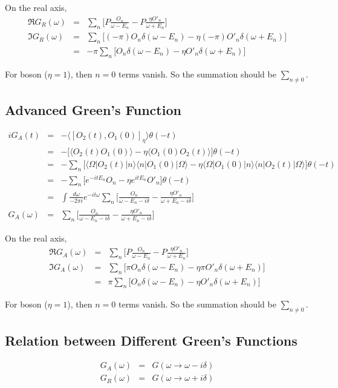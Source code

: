 \documentclass[12pt]{book}
\begin{document}
	On the real axis,
	\begin{eqnarray}
		\Re G_R(\omega)&=&\sum_n\Big[P\frac{O_n}{\omega-E_n}-P\frac{\eta O'_n}{\omega+E_n}\Big]\\
		\Im G_R(\omega)&=&\sum_{n}\big[(-\pi)O_n\delta(\omega-E_n)-\eta(-\pi)O'_n\delta(\omega+E_n)\big]\\
		&=&-\pi\sum_{n}\big[O_n\delta(\omega-E_n)-\eta O'_n\delta(\omega+E_n)\big]
	\end{eqnarray}
	
	For boson ($\eta=1$), then $n=0$ terms vanish. So the summation should be $\sum_{n\neq 0}$.
	\subsection{Advanced Green's Function}
	\begin{eqnarray}
		iG_A(t)&=&-\langle [O_2(t),O_1(0)]_\eta\rangle\theta(-t)\\
		&=&-\big[\langle O_2(t)O_1(0)\rangle-\eta\langle O_1(0)O_2(t)\rangle\big]\theta(-t)\\
		&=&-\sum_{n}\big[\langle\Omega|O_2(t)|n\rangle\langle n|O_1(0)|\Omega\rangle-\eta\langle\Omega|O_1(0)|n\rangle\langle n|O_2(t)|\Omega\rangle\big]\theta(-t)\\
		&=&-\sum_n\big[e^{-it E_n}O_n-\eta e^{it E_n}O'_n\big]\theta(-t)\\
		&=&\int\frac{d\omega}{-2\pi i}e^{-it\omega}\sum_{n}\Big[\frac{O_n}{\omega-E_n-i\delta}-\frac{\eta O'_n}{\omega+E_n-i\delta}\Big]\\
		G_A(\omega)&=&\sum_n\Big[\frac{O_n}{\omega-E_n-i\delta}-\frac{\eta O'_n}{\omega+E_n-i\delta}\Big]
	\end{eqnarray}
	
	On the real axis,
	\begin{eqnarray}
		\Re G_A(\omega)&=&\sum_n\Big[P\frac{O_n}{\omega-E_n}-P\frac{\eta O'_n}{\omega+E_n}\Big]\\
		\Im G_A(\omega)&=&\sum_{n}\big[\pi O_n\delta(\omega-E_n)-\eta\pi O'_n\delta(\omega+E_n)\big]\\
		&=&\pi\sum_{n}\big[O_n\delta(\omega-E_n)-\eta O'_n\delta(\omega+E_n)\big]
	\end{eqnarray}
	
	For boson ($\eta=1$), then $n=0$ terms vanish. So the summation should be $\sum_{n\neq 0}$.
	\subsection{Relation between Different Green's Functions}
	\begin{eqnarray}
		G_A(\omega)&=&G(\omega\rightarrow \omega-i\delta)\\
		G_R(\omega)&=&G(\omega\rightarrow \omega+i\delta)
	\end{eqnarray}
	
\end{document}

